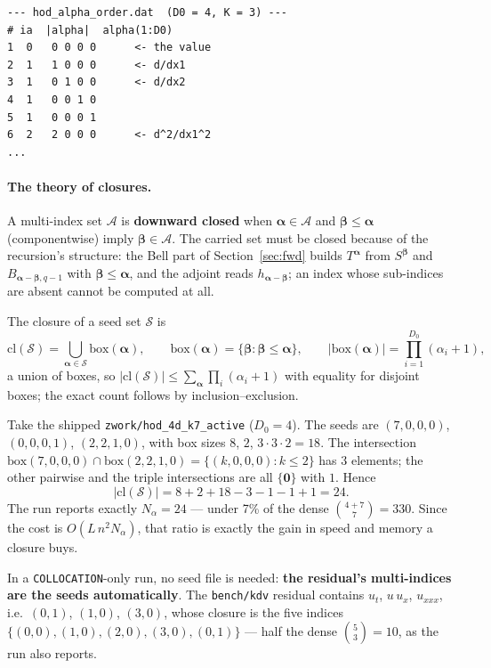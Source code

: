 \documentclass[10pt,a4paper]{article}
\newcommand{\code}[1]{\texttt{#1}}
\newcommand{\mi}[1]{\boldsymbol{#1}}
\begin{document}
\begin{verbatim}
--- hod_alpha_order.dat  (D0 = 4, K = 3) ---
# ia  |alpha|  alpha(1:D0)
1  0   0 0 0 0      <- the value
2  1   1 0 0 0      <- d/dx1
3  1   0 1 0 0      <- d/dx2
4  1   0 0 1 0
5  1   0 0 0 1
6  2   2 0 0 0      <- d^2/dx1^2
...
\end{verbatim}

\paragraph{The theory of closures.}
A multi-index set $\mathcal{A}$ is \textbf{downward closed} when
$\mi\alpha\in\mathcal{A}$ and $\mi\beta\le\mi\alpha$ (componentwise)
imply $\mi\beta\in\mathcal{A}$. The carried set must be closed
because of the recursion's structure: the Bell part of
Section~\ref{sec:fwd} builds $T^{\mi\alpha}$ from $S^{\mi\beta}$ and
$B_{\mi\alpha-\mi\beta,q-1}$ with $\mi\beta\le\mi\alpha$, and the
adjoint reads $h_{\mi\alpha-\mi\beta}$; an index whose sub-indices
are absent cannot be computed at all.

The closure of a seed set $\mathcal{S}$ is
\[
\mathrm{cl}(\mathcal{S})=\bigcup_{\mi\alpha\in\mathcal{S}}
\mathrm{box}(\mi\alpha),\qquad
\mathrm{box}(\mi\alpha)=\{\mi\beta:\mi\beta\le\mi\alpha\},\qquad
|\mathrm{box}(\mi\alpha)|=\prod_{i=1}^{D_0}(\alpha_i+1),
\]
a union of boxes, so
$|\mathrm{cl}(\mathcal{S})|\le\sum_{\mi\alpha}\prod_i(\alpha_i+1)$
with equality for disjoint boxes; the exact count follows by
inclusion--exclusion.

Take the shipped \code{zwork/hod\_4d\_k7\_active} ($D_0=4$). The
seeds are $(7,0,0,0)$, $(0,0,0,1)$, $(2,2,1,0)$, with box sizes $8$,
$2$, $3\cdot3\cdot2=18$. The intersection
$\mathrm{box}(7,0,0,0)\cap\mathrm{box}(2,2,1,0)=\{(k,0,0,0):k\le2\}$
has $3$ elements; the other pairwise and the triple intersections are
all $\{\mi 0\}$ with $1$. Hence
\[
|\mathrm{cl}(\mathcal{S})|=8+2+18-3-1-1+1=24 .
\]
The run reports exactly $N_\alpha=24$ --- under 7\% of the dense
$\binom{4+7}{7}=330$. Since the cost is $O(L\,n^2 N_\alpha)$, that
ratio is exactly the gain in speed and memory a closure buys.

In a \code{COLLOCATION}-only run, no seed file is needed:
\textbf{the residual's multi-indices are the seeds automatically}.
The \code{bench/kdv} residual contains $u_t$, $u\,u_x$, $u_{xxx}$,
i.e.\ $(0,1)$, $(1,0)$, $(3,0)$, whose closure is the five indices
$\{(0,0),(1,0),(2,0),(3,0),(0,1)\}$ --- half the dense
$\binom{5}{3}=10$, as the run also reports.
\end{document}
